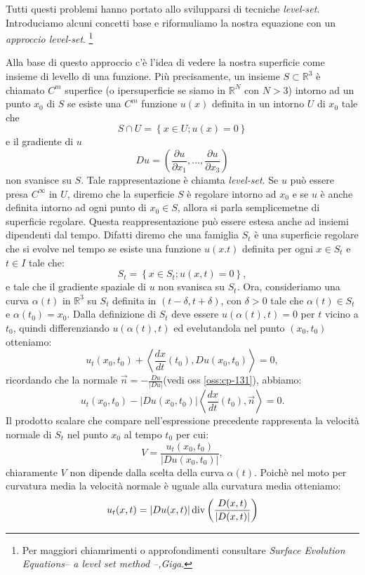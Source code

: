 Tutti questi problemi hanno portato allo svilupparsi di tecniche \emph{level-set}. Introduciamo alcuni concetti base e riformuliamo la nostra equazione con un \emph{approccio level-set}.%
\footnote{Per maggiori chiamrimenti o approfondimenti consultare \emph{Surface Evolution Equations-- a level set method --,Giga}.}    %

Alla base di questo approccio c'è l'idea di vedere la nostra superficie come  insieme di levello di una funzione. Più precisamente,
un insieme $S\subset\mathbb{R}^3$ è chiamato $C^m$ superfice (o ipersuperficie se siamo in $\mathbb{R}^N$ con $N>3$) intorno ad un punto $x_0$ di $S$ se esiste una $C^m$ funzione $u(x)$ definita in un intorno $U$ di $x_0$ tale che
\[
S\cap U=\left\{x\in U; u(x)=0\right\}
\]
e il gradiente di $u$
\[
 Du=\left(\frac{\partial u}{\partial x_1},\dots,\frac{\partial u}{\partial x_3}\right)
\]
non svanisce su $S$. Tale rappresentazione è chiamta \emph{level-set}. Se $u$ può essere presa $C^{\infty}$ in $U$, diremo che la superficie $S$ è regolare intorno ad $x_0$ e se $u$ è anche definita intorno ad ogni punto di $x_0\in S$, allora si parla semplicemetne di superficie regolare. Questa reappresentazione può essere estesa anche ad insiemi dipendenti dal tempo. Difatti diremo che una famiglia $S_t$ è una superficie regolare che si evolve nel tempo se esiste una funzione $u(x.t)$ definita per ogni $x\in S_t$ e $t\in I$ tale che:
\[
S_t=\left\{x\in S_t; u(x,t)=0\right\},
\]
e tale che il gradiente spaziale di $u$ non svanisca su $S_t$. Ora, consideriamo una curva $\alpha(t)$ in $\mathbb{R}^3$ su $S_t$ definita in $(t-\delta,t+\delta)$, con $\delta>0$ tale che $\alpha(t)\in S_t$ e $\alpha(t_0)=x_0$. Dalla definizione di $S_t$ deve essere $u(\alpha(t),t)=0$ per $t$ vicino a $t_0$, quindi differenziando  $u(\alpha(t),t)$ ed evelutandola nel punto $(x_0,t_0)$ otteniamo:
\[
u_t(x_0,t_0)+\left<\frac{dx}{dt}(t_0),Du(x_0,t_0)\right>=0,
\]
ricordando che la normale $\vec{n}=-\frac{Du}{|Du|}$(vedi oss \ref{oss:cp-131}), abbiamo:
\[
u_t(x_0,t_0)-|Du(x_0,t_0)|\left<\frac{dx}{dt}(t_0),\vec{n}\right>=0.
\]
Il prodotto scalare che compare nell'espressione precedente rappresenta la velocità normale di $S_t$ nel punto $x_0$ al tempo $t_0$ per cui: 
\[
V=\frac{u_t(x_0,t_0)}{|Du(x_0,t_0)|},
\]
chiaramente  $V$ non dipende dalla scelta della curva $\alpha(t)$. Poichè nel moto per curvatura media la velocità normale è uguale alla curvatura media otteniamo:
\begin{equation}
  \label{eq:cp-131}
  u_t(x,t)=|Du(x,t)|\operatorname{div}{\left(\frac{D(x,t)}{|D(x,t)|}\right)}
\end{equation}
